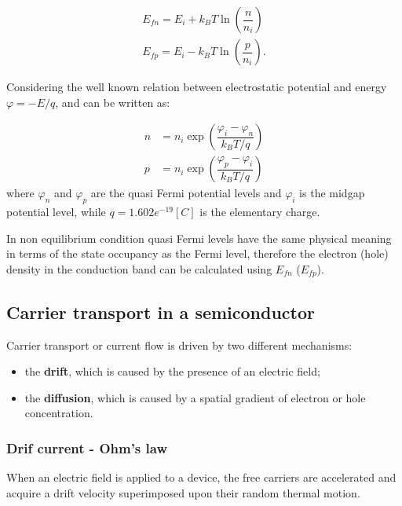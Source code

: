 \begin{align}
E_{fn} = E_i + k_B T \ln\left( \dfrac{n}{n_i} \right) \label{eq: quasi fermi level electron} \\
E_{fp} = E_i - k_B T \ln\left( \dfrac{p}{n_i} \right). \label{eq: quasi fermi level hole}
\end{align}


Considering the well known relation between electrostatic potential and energy $\varphi = -E/q$,  and  can be written as:

\begin{align}
n & = n_i \exp\left(\dfrac{\varphi_{i}-\varphi_n}{k_BT/q}\right) \label{eq: non eq n density mb}\\
p & = n_i \exp\left(\dfrac{\varphi_p-\varphi_{i}}{k_BT/q}\right)  \label{eq: non eq p density mb}
\end{align}
where $\varphi_n$ and $\varphi_p$ are the quasi Fermi potential levels and $\varphi_i$ is the midgap potential level, while $q=1.602e^{-19}[C]$ is the elementary charge. 

\begin{Osservazione}
In non equilibrium condition quasi Fermi levels have the same physical meaning in terms of the state occupancy as the Fermi level, therefore the electron (hole) density in the conduction band can be calculated using $E_{fn}$ ($E_{fp}$).
\end{Osservazione}

\subsection{Carrier transport in a semiconductor}
\label{sec: carrier transport}

Carrier transport or current flow is driven by two different mechanisms:
\begin{itemize}
\item the \textbf{drift}, which is caused by the presence of an electric field;
\item the \textbf{diffusion}, which is caused by a spatial gradient of electron or hole concentration.
\end{itemize}

\subsubsection{Drif current - Ohm's law}

When an electric field is applied to a device, the free carriers are accelerated and acquire a drift velocity superimposed upon their random thermal motion.

